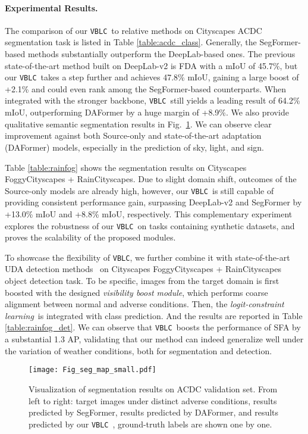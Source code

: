 \documentclass[letterpaper]{article} \usepackage{aaai23}  \usepackage{times}  \usepackage{helvet}  \usepackage{courier}  \usepackage[hyphens]{url}  \usepackage{graphicx} \urlstyle{rm} \def\UrlFont{\rm}  \usepackage{natbib}  \usepackage{caption} \frenchspacing  \setlength{\pdfpagewidth}{8.5in}  \setlength{\pdfpageheight}{11in}  \usepackage{algorithm}
\newcommand{\method}{\texttt{VBLC}~}
\newcommand{\methodblank}{\texttt{VBLC}}
\newcommand{\boostModuleName}{\textit{visibility boost module}}
\newcommand{\lossModuleName}{\textit{logit-constraint learning}}
\begin{document}
\paragraph{Experimental Results.} The comparison of our \method to relative methods on Cityscapes  ACDC segmentation task is listed in Table \ref{table:acdc_class}. Generally, the SegFormer-based methods substantially outperform the DeepLab-based ones. The previous state-of-the-art method built on DeepLab-v2 is FDA with a mIoU of 45.7\%, but our \method takes a step further and achieves 47.8\% mIoU, gaining a large boost of +2.1\% and could even rank among the SegFormer-based counterparts. When integrated with the stronger backbone, \method still yields a leading result of 64.2\% mIoU, outperforming DAFormer by a huge margin of +8.9\%. We also provide qualitative semantic segmentation results in Fig.~\ref{fig:segmap}. We can observe clear improvement against both Source-only and state-of-the-art adaptation (DAFormer) models, especially in the prediction of sky, light, and sign. 

Table \ref{table:rainfog} shows the segmentation results on Cityscapes  FoggyCityscapes + RainCityscapes. Due to slight domain shift, outcomes of the Source-only models are already high, however, our \method is still capable of providing consistent performance gain, surpassing DeepLab-v2 and SegFormer by +13.0\% mIoU and +8.8\% mIoU, respectively. This complementary experiment explores the robustness of our \method on tasks containing synthetic datasets, and proves the scalability of the proposed modules.

To showcase the flexibility of \methodblank, we further combine it with state-of-the-art UDA detection methods~\cite{Wang2021SFA} on Cityscapes  FoggyCityscapes + RainCityscapes object detection task. To be specific, images from the target domain is first boosted with the designed \boostModuleName, which performs coarse alignment between normal and adverse conditions. Then, the \lossModuleName~is integrated with class prediction.  And the results are reported in Table \ref{table:rainfog_det}. We can observe that \method boosts the performance of SFA by a substantial 1.3 AP, validating that our method can indeed generalize well under the variation of weather conditions, both for segmentation and detection.

\begin{figure}[t]
    \centering
    \texttt{[image: Fig\_seg\_map\_small.pdf]}
    \caption{Visualization of segmentation results on ACDC validation set. From left to right: target images under distinct adverse conditions, results predicted by SegFormer, results predicted by DAFormer, and results predicted by our \method, ground-truth labels are shown one by one.}
    \label{fig:segmap}
\end{figure}
\end{document}
